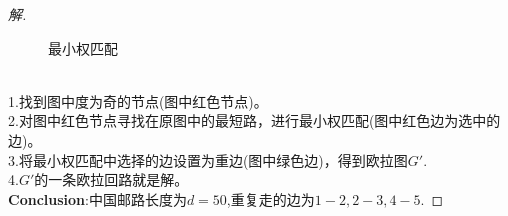 \documentclass[UTF8, onecolumn, a4paper]{article}
\begin{document}
\begin{description}
\begin{proof}[解]
\begin{figure}[h]
{\begin{minipage}[t]{0.3\linewidth}
			\caption{最小权匹配}
		\end{minipage}
	}
\end{figure}
\\1.找到图中度为奇的节点(图中红色节点)。\\
2.对图中红色节点寻找在原图中的最短路，进行最小权匹配(图中红色边为选中的边)。\\
3.将最小权匹配中选择的边设置为重边(图中绿色边)，得到欧拉图$G'$.\\
4.\quad$G'$的一条欧拉回路就是解。\\
\textbf{Conclusion}:中国邮路长度为$d = 50$,重复走的边为$1-2,2-3,4-5$.
\end{proof}


\end{description}
\end{document}
